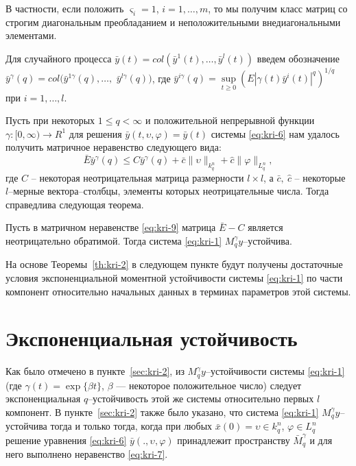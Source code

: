 В частности, если положить $\varsigma _i = 1$, $i = 1,\dots,m$, то мы
получим класс матриц со строгим диагональным преобладанием и
неположительными внедиагональными элементами.

Для случайного процесса $\bar y(t) = col(\bar y^1(t),\dots, \bar
y^l(t))$ введем обозначение $ \bar y^\gamma (q) = col (\bar
y^{1\gamma }(q),\dots,$ $\bar y^{l\gamma }(q))$, где $\bar y^{i\gamma
}(q) = \sup \limits _{t \geq 0}\left (E|\gamma (t) \bar
y^i(t)|^{q}\right )^{1/q}$ при $i = 1,\dots,l$.

Пусть при некоторых $1\le q < \infty $ и положительной непрерывной
функции \linebreak $\gamma :[0, \infty) \rightarrow R^1$ для решения $\bar
y(t,\upsilon,\varphi) =  \bar y(t)$ системы \eqref{eq:kri-6} нам удалось
получить матричное неравенство следующего вида:
\begin{equation}
    \label{eq:kri-9}
    \bar E\bar y^\gamma (q) \leq C\bar y^\gamma (q) + \bar
    c\|\upsilon\|_{k^n_{q}} + \hat c \|\varphi \|_{L^n_q} ,
\end{equation}
где $C$ -- некоторая неотрицательная матрица размерности $l\times
l$, а $\bar c, \ \hat c$ -- некоторые $l$--мерные вектора--столбцы,
элементы которых неотрицательные числа. Тогда справедлива следующая
теорема.

\begin{theorem}\label{th:kri-2}
    Пусть в матричном неравенстве \eqref{eq:kri-9} матрица
    $\bar E - C$ является неотрицательно обратимой. Тогда система \eqref{eq:kri-1}
    $M_q^\gamma y$--устойчива.
\end{theorem}


На основе Теоремы~\ref{th:kri-2} в следующем пункте будут получены достаточные
условия экспоненциальной моментной устойчивости системы \eqref{eq:kri-1} по части
компонент относительно начальных данных в терминах параметров этой
системы.

\section{Экспоненциальная устойчивость}\label{sec:kri-3}

Как было отмечено в
пункте~\ref{sec:kri-2}, из $M_q^\gamma y$--устойчивости системы \eqref{eq:kri-1} (где $\gamma
(t) = \exp \{\beta t\}$, $\beta$ --- некоторое положительное число)
следует экспоненциальная $q$--устойчивость этой же системы
относительно первых $l$ компонент. В пункте~\ref{sec:kri-2} также было указано,
что система \eqref{eq:kri-1} $M_q^\gamma y$--устойчива тогда и только тогда,
когда при любых $\bar x(0) = \upsilon \in k^n_q$, $\varphi \in
L^n_q$ решение уравнения \eqref{eq:kri-6} $\bar y(., \upsilon, \varphi)$
принадлежит пространству $\bar M_q^\gamma $ и для него выполнено
неравенство \eqref{eq:kri-7}.

